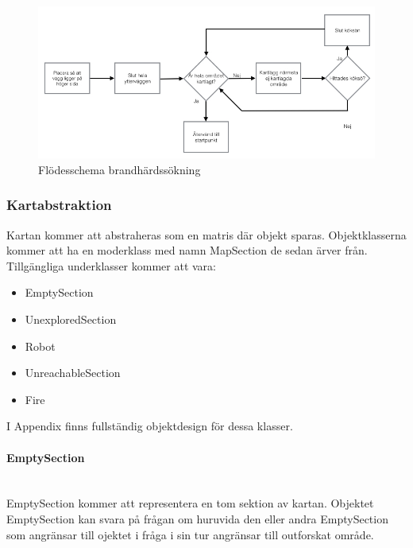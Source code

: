 \documentclass[a4paper,12pt,fleqn]{article}
\begin{document}
\begin{figure}[htp] %
  \begin{center}
  \includegraphics[keepaspectratio=true,scale=0.5]{Flode_kartritning.jpg}  %
  \end{center}
  \caption{Flödesschema brandhärdssökning} %
  \label{fig:fire} %
\end{figure}

\subsubsection{Kartabstraktion}
Kartan kommer att abstraheras som en matris där objekt sparas. Objektklasserna kommer att ha en moderklass med namn MapSection de sedan ärver från. Tillgängliga underklasser kommer att vara:

\begin{itemize}
\item{EmptySection}
\item{UnexploredSection}
\item{Robot}
\item{UnreachableSection}
\item{Fire}
\end{itemize}

I Appendix finns fullständig objektdesign för dessa klasser. 

\paragraph{EmptySection} 
~\\
EmptySection kommer att representera en tom sektion av kartan. Objektet EmptySection kan svara på frågan om huruvida den eller andra EmptySection som angränsar till ojektet i fråga i sin tur angränsar till outforskat område. 
\end{document}
